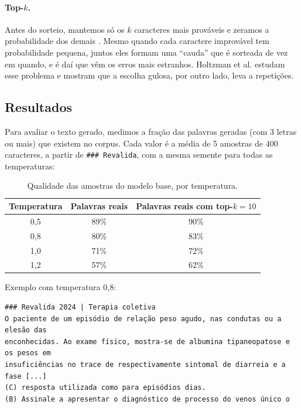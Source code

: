 \documentclass[11pt,a4paper]{article}
\begin{document}
\paragraph{Top-$k$.} Antes do sorteio, mantemos só os $k$ caracteres mais prováveis e zeramos a probabilidade dos demais \cite{fan2018}. Mesmo quando cada caractere improvável tem probabilidade pequena, juntos eles formam uma ``cauda'' que é sorteada de vez em quando, e é daí que vêm os erros mais estranhos. Holtzman et al. \cite{holtzman} estudam esse problema e mostram que a escolha gulosa, por outro lado, leva a repetições.

\subsection{Resultados}

Para avaliar o texto gerado, medimos a fração das palavras geradas (com 3 letras ou mais) que existem no corpus. Cada valor é a média de 5 amostras de 400 caracteres, a partir de \texttt{\#\#\# Revalida}, com a mesma semente para todas as temperaturas:

\begin{table}[H]
\centering
\begin{tabular}{@{}ccc@{}}
\toprule
Temperatura & Palavras reais & Palavras reais com top-$k=10$ \\
\midrule
0,5 & 89\% & 90\% \\
0,8 & 80\% & 83\% \\
1,0 & 71\% & 72\% \\
1,2 & 57\% & 62\% \\
\bottomrule
\end{tabular}
\caption{Qualidade das amostras do modelo base, por temperatura.}
\label{tab:temperatura}
\end{table}

Exemplo com temperatura 0,8:
\begin{lstlisting}[language={},basicstyle=\ttfamily\footnotesize]
### Revalida 2024 | Terapia coletiva
O paciente de um episódio de relação peso agudo, nas condutas ou a elesão das
enconhecidas. Ao exame físico, mostra-se de albumina tipaneopatose e os pesos em
insuficiências no trace de respectivamente sintomal de diarreia e a fase [...]
(C) resposta utilizada como para episódios dias.
(B) Assinale a apresentar o diagnóstico de processo do venos único o
\end{lstlisting}
\end{document}
